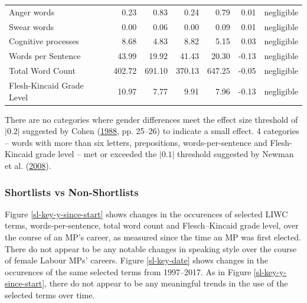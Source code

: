 \documentclass[]{article}
\begin{document}
\begin{table}
\begin{tabular}[t]{lrrrrrl}
Anger words & 0.23 & 0.83 & 0.24 & 0.79 & 0.01 & negligible\\
Swear words & 0.00 & 0.06 & 0.00 & 0.09 & 0.01 & negligible\\
Cognitive processes & 8.68 & 4.83 & 8.82 & 5.15 & 0.03 & negligible\\
\addlinespace
Words per Sentence & 43.99 & 19.92 & 41.43 & 20.30 & -0.13 & negligible\\
Total Word Count & 402.72 & 691.10 & 370.13 & 647.25 & -0.05 & negligible\\
Flesh-Kincaid Grade Level & 10.97 & 7.77 & 9.91 & 7.96 & -0.13 & negligible\\
\bottomrule
\end{tabular}
\end{table}

There are no categories where gender differences meet the effect size
threshold of \(|0.2|\) suggested by Cohen
(\protect\hyperlink{ref-cohen1988}{1988}, pp. 25--26) to indicate a
small effect. 4 categories -- words with more than six letters,
prepositions, words-per-sentence and Flesh-Kincaid grade level -- met or
exceeded the \(|0.1|\) threshold suggested by Newman et al.
(\protect\hyperlink{ref-newman2008}{2008}).

\hypertarget{shortlists-vs-non-shortlists}{%
\subsubsection{Shortlists vs
Non-Shortlists}\label{shortlists-vs-non-shortlists}}

Figure \ref{sl-key-y-since-start} shows changes in the occurences of
selected LIWC terms, words-per-sentence, total word count and
Flesch--Kincaid grade level, over the course of an MP's career, as
measured since the time an MP was first elected. There do not appear to
be any notable changes in speaking style over the course of female
Labour MPs' careers. Figure \ref{sl-key-date} shows changes in the
occurences of the same selected terms from 1997--2017. As in Figure
\ref{sl-key-y-since-start}, there do not appear to be any meaningful
trends in the use of the selected terms over time.
\end{document}
